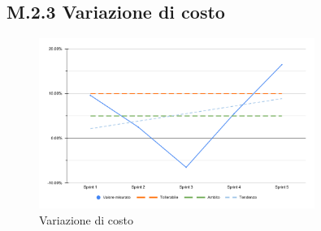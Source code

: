 \subsection{M.2.3 Variazione di costo}
\begin{figure}[H]
    \centering
    \includegraphics[width=0.8\textwidth]{assets/variazione_costo.pdf}
    \caption{Variazione di costo}
\end{figure}